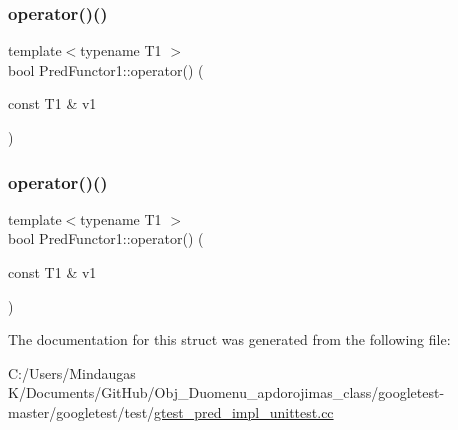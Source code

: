 \subsubsection{\texorpdfstring{operator()()}{operator()()}\hspace{0.1cm}{\footnotesize\ttfamily [2/3]}}
{\footnotesize\ttfamily template$<$typename T1 $>$ \\
bool Pred\+Functor1\+::operator() (\begin{DoxyParamCaption}\item[{const T1 \&}]{v1 }\end{DoxyParamCaption})\hspace{0.3cm}{\ttfamily [inline]}}

\mbox{\label{struct_pred_functor1_a78d81d1bac0ee7f81ea631c49bfab3e2}} 
\subsubsection{\texorpdfstring{operator()()}{operator()()}\hspace{0.1cm}{\footnotesize\ttfamily [3/3]}}
{\footnotesize\ttfamily template$<$typename T1 $>$ \\
bool Pred\+Functor1\+::operator() (\begin{DoxyParamCaption}\item[{const T1 \&}]{v1 }\end{DoxyParamCaption})\hspace{0.3cm}{\ttfamily [inline]}}



The documentation for this struct was generated from the following file\+:\begin{DoxyCompactItemize}
\item 
C\+:/\+Users/\+Mindaugas K/\+Documents/\+Git\+Hub/\+Obj\+\_\+\+Duomenu\+\_\+apdorojimas\+\_\+class/googletest-\/master/googletest/test/\mbox{\hyperlink{googletest-master_2googletest_2test_2gtest__pred__impl__unittest_8cc}{gtest\+\_\+pred\+\_\+impl\+\_\+unittest.\+cc}}\end{DoxyCompactItemize}

